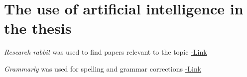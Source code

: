 \chapter*{The use of artificial intelligence in the thesis}

\textit{Research rabbit}  was used to find papers relevant to the topic \href{https://www.researchrabbit.ai/}{-Link}

\textit{Grammarly} was used for spelling and grammar corrections \href{https://www.grammarly.com/}{-Link}